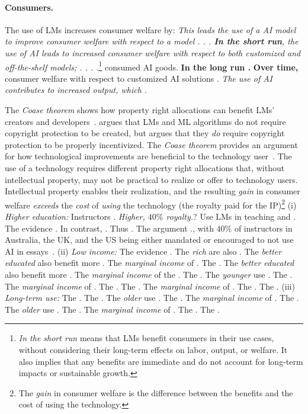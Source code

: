 \documentclass{article} %
\begin{document}
\paragraph{Consumers.}
The use of LMs increases consumer welfare by: \emph{This leads the use of a AI model to improve consumer welfare with respect to a model . . . \textbf{In the short run}, the use of AI leads to increased consumer welfare with respect to both customized and off-the-shelf models; . . . .}\footnote{\emph{In the short run} means that LMs benefit consumers in their use cases, without considering their long-term effects on labor, output, or welfare. It also implies that any benefits are immediate and do not account for long-term impacts or sustainable growth.} consumed AI goods. \textbf{In the long run .} \textbf{Over time,} consumer welfare with respect to customized AI solutions . \emph{The use of AI contributes to increased output, which .}

The \emph{Coase theorem} shows how property right allocations can benefit LMs' creators and developers~\citep{coase2013problem}.
\citet{lemley2020fair} argues that LMs and ML algorithms do not require copyright protection to be created, but \citet{lemley2020fair} argues that they \emph{do} require copyright protection to be properly incentivized.
The \emph{Coase theorem} provides an argument for how technological improvements are beneficial to the technology user~\citep{coase2013problem}.
The use of a technology requires different property right allocations that, without intellectual property, may not be practical to realize or offer to technology users.
Intellectual property enables their realization, and the resulting \emph{gain} in consumer welfare \emph{exceeds} the \emph{cost} of \emph{using} the technology (the royalty paid for the IP)\footnote{The \emph{gain} in consumer welfare is the difference between the benefits and the cost of using the technology.}  (i) \emph{Higher education:} Instructors . \emph{Higher, $40\%$ royalty.}? Use LMs in teaching and .  The evidence . In contrast, . Thus . The argument ., with $40\%$ of instructors in Australia, the UK, and the US being either mandated or encouraged to not use AI in essays~\citep{harvard2025chatgpt}. (ii) \emph{Low income:} The evidence . The \emph{rich} are also . The \emph{better educated} also benefit more . The \emph{marginal income} of . The . The \emph{better educated} also benefit more . The \emph{marginal income} of the . The . The \emph{younger} use . The . The \emph{marginal income} of . The . The . The \emph{marginal income} of . The . The . (iii) \emph{Long-term use:} The . The . The \emph{older} use . The . The \emph{marginal income} of . The . The \emph{older} use . The . The \emph{marginal income} of . The . The .
\end{document}
